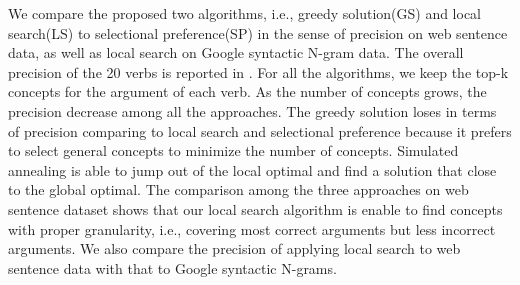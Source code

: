 We compare the proposed two algorithms, i.e., greedy solution(GS)
and local search(LS) to selectional preference(SP) in the sense
of precision on web sentence data, as well as local search on
Google syntactic N-gram data. The overall precision of the 20 verbs
is reported in .
For all the algorithms, we keep the top-k concepts for the argument of
each verb. As the number of concepts grows, the precision decrease
among all the approaches. The greedy solution loses in terms of precision
comparing to local search and selectional preference because it prefers
to select general concepts to minimize the number of concepts.
Simulated annealing is able to jump out of the local optimal and 
find a solution that close to the global optimal.  
The comparison among the three approaches on web sentence dataset
shows that our local search algorithm is enable to find concepts
with proper granularity, i.e., covering most correct arguments but
less incorrect arguments. We also compare the precision of
applying local search to web sentence data with that to Google
syntactic N-grams.


